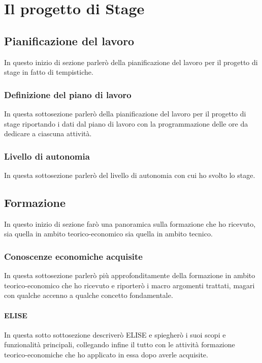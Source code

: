 
\chapter{Il progetto di Stage}

\section{Pianificazione del lavoro}
In questo inizio di sezione parlerò della pianificazione del lavoro per il progetto di stage in fatto di tempistiche.

\subsection{Definizione del piano di lavoro}
In questa sottosezione parlerò della pianificazione del lavoro per il progetto di stage riportando i dati dal piano di lavoro con la programmazione delle ore da dedicare a ciascuna attività.
	
\subsection{Livello di autonomia}
In questa sottosezione parlerò del livello di autonomia con cui ho svolto lo stage.

\section{Formazione}
In questo inizio di sezione farò una panoramica sulla formazione che ho ricevuto, sia quella in ambito teorico-economico sia quella in ambito tecnico.

\subsection{Conoscenze economiche acquisite}
In questa sottosezione parlerò più approfonditamente della formazione in ambito teorico-economico che ho ricevuto e riporterò i macro argomenti trattati, magari con qualche accenno a qualche concetto fondamentale.

\subsubsection{ELISE}
In questa sotto sottosezione descriverò ELISE e spiegherò i suoi scopi e funzionalità principali, collegando infine il tutto con le attività formazione teorico-economiche che ho applicato in essa dopo averle acquisite.


